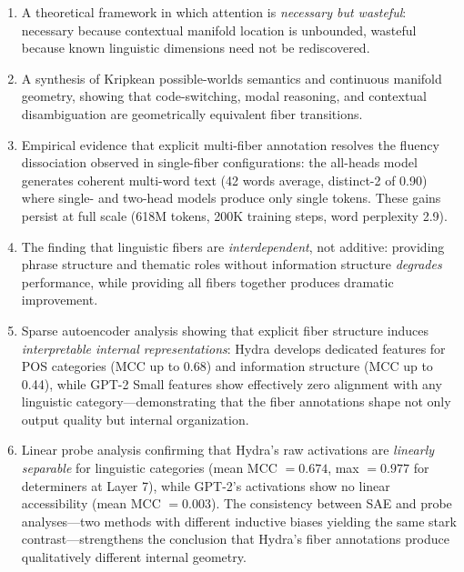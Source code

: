 \documentclass[11pt]{article}
\begin{document}
\begin{enumerate}
    \item A theoretical framework in which attention is \emph{necessary but 
    wasteful}: necessary because contextual manifold location is unbounded, 
    wasteful because known linguistic dimensions need not be rediscovered.
    
    \item A synthesis of Kripkean possible-worlds semantics and continuous 
    manifold geometry, showing that code-switching, modal reasoning, and 
    contextual disambiguation are geometrically equivalent fiber transitions.
    
    \item Empirical evidence that explicit multi-fiber annotation resolves 
    the fluency dissociation observed in single-fiber configurations: the 
    all-heads model generates coherent multi-word text (42 words average, 
    distinct-2 of 0.90) where single- and two-head models produce only 
    single tokens. These gains persist at full scale (618M tokens, 200K 
    training steps, word perplexity 2.9).
    
    \item The finding that linguistic fibers are \emph{interdependent}, not 
    additive: providing phrase structure and thematic roles without 
    information structure \emph{degrades} performance, while providing all 
    fibers together produces dramatic improvement.
    
    \item Sparse autoencoder analysis showing that explicit fiber structure 
    induces \emph{interpretable internal representations}: Hydra develops 
    dedicated features for POS categories (MCC up to 0.68) and information 
    structure (MCC up to 0.44), while GPT-2 Small features show effectively 
    zero alignment with any linguistic category---demonstrating that the 
    fiber annotations shape not only output quality but internal organization.
    
    \item Linear probe analysis confirming that Hydra's raw activations are 
    \emph{linearly separable} for linguistic categories (mean MCC $= 0.674$, 
    max $= 0.977$ for determiners at Layer 7), while GPT-2's activations 
    show no linear accessibility (mean MCC $= 0.003$). The consistency 
    between SAE and probe analyses---two methods with different inductive 
    biases yielding the same stark contrast---strengthens the conclusion 
    that Hydra's fiber annotations produce qualitatively different 
    internal geometry.
\end{enumerate}
\end{document}

